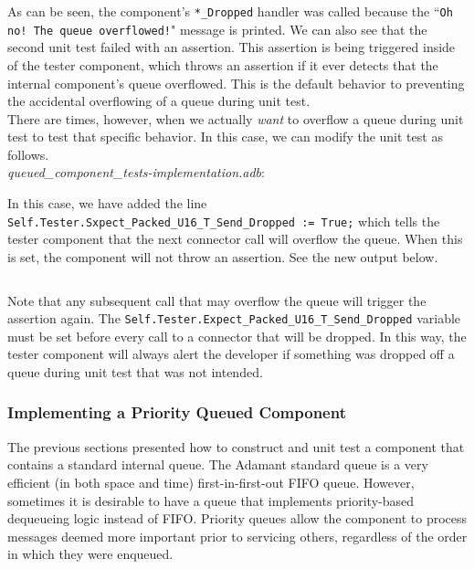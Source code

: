As can be seen, the component's \texttt{*\_Dropped} handler was called because the ``\texttt{Oh no! The queue overflowed!}" message is printed. We can also see that the second unit test failed with an assertion. This assertion is being triggered inside of the tester component, which throws an assertion if it ever detects that the internal component's queue overflowed. This is the default behavior to preventing the accidental overflowing of a queue during unit test. \\

There are times, however, when we actually \textit{want} to overflow a queue during unit test to test that specific behavior. In this case, we can modify the unit test as follows. \\

\textit{queued\_component\_tests-implementation.adb}:

In this case, we have added the line \texttt{Self.Tester.Sxpect\_Packed\_U16\_T\_Send\_Dropped := True;} which tells the tester component that the next connector call will overflow the queue. When this is set, the component will not throw an assertion. See the new output below.

\vspace{5mm} %
\inputminted{text}{../example_architecture/queued_component/test2/output.txt}
\vspace{5mm} %

Note that any subsequent call that may overflow the queue will trigger the assertion again. The \texttt{Self.Tester.Expect\_Packed\_U16\_T\_Send\_Dropped} variable must be set before every call to a connector that will be dropped. In this way, the tester component will always alert the developer if something was dropped off a queue during unit test that was not intended. 

\subsubsection{Implementing a Priority Queued Component} \label{Implementing a Priority Queued Component}

The previous sections presented how to construct and unit test a component that contains a standard internal queue. The Adamant standard queue is a very efficient (in both space and time) first-in-first-out FIFO queue. However, sometimes it is desirable to have a queue that implements priority-based dequeueing logic instead of FIFO. Priority queues allow the component to process messages deemed more important prior to servicing others, regardless of the order in which they were enqueued. \\

